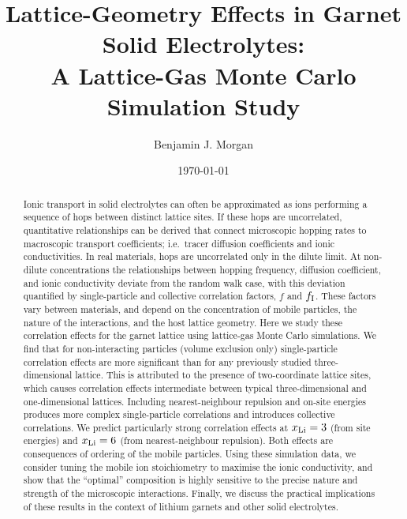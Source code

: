 \documentclass[aps,prb,twocolumn,superscriptaddress,reprint]{revtex4-1}
\newcommand{\xLi}{x_\m{Li}}
\begin{document}
\title{Lattice-Geometry Effects in Garnet Solid Electrolytes:\\ A Lattice-Gas Monte Carlo Simulation Study}
\author{Benjamin J. Morgan}

\date{\today}

\begin{abstract}
Ionic transport in solid electrolytes can often be approximated as ions performing a sequence of hops between distinct lattice sites. If these hops are uncorrelated, quantitative relationships can be derived that connect microscopic hopping rates to macroscopic transport coefficients; i.e.\ tracer diffusion coefficients and ionic conductivities. In real materials, hops are uncorrelated only in the dilute limit. At non-dilute concentrations the relationships between hopping frequency, diffusion coefficient, and ionic conductivity deviate from the random walk case, with this deviation quantified by single-particle and collective correlation factors, $f$ and $f_{\mathrm{I}}$. These factors vary between materials, and depend on the concentration of mobile particles, the nature of the interactions, and the host lattice geometry. 
Here we study these correlation effects for the garnet lattice using lattice-gas Monte Carlo simulations. We find that for non-interacting particles (volume exclusion only) single-particle correlation effects are more significant than for any previously studied three-dimensional lattice. This is attributed to the presence of two-coordinate lattice sites, which causes correlation effects intermediate between typical three-dimensional and one-dimensional lattices. Including nearest-neighbour repulsion and on-site energies produces more complex single-particle correlations and introduces collective correlations. We predict particularly strong correlation effects at $\xLi=3$ (from site energies) and $\xLi=6$ (from nearest-neighbour repulsion). Both effects are consequences of ordering of the mobile particles. Using these simulation data, we consider tuning the mobile ion stoichiometry to maximise the ionic conductivity, and show that the ``optimal'' composition is highly sensitive to the precise nature and strength of the microscopic interactions.
Finally, we discuss the practical implications of these results in the context of lithium garnets and other solid electrolytes.
\end{abstract}

\maketitle
\end{document}
